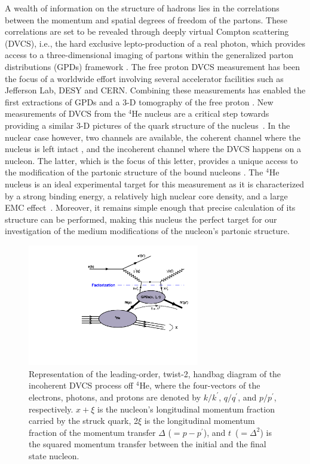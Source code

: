 \documentclass[twocolumn,nofootinbib,showpacs,prl,superscriptaddress,secnumarabic,amssymb,nobibnotes,aps,floatfix]{revtex4}
\begin{document}
A wealth of information on the structure of hadrons lies in the correlations 
between the momentum and spatial degrees of freedom of the partons. These 
correlations are set to be revealed through deeply virtual Compton scattering 
(DVCS), i.e., the hard exclusive lepto-production of a real photon, which 
provides access to a three-dimensional imaging of partons within the 
generalized parton distributions (GPDs) framework 
\cite{Mueller:1998fv,Ji:1996ek,Ji:1996nm,Radyushkin:1996nd,Radyushkin:1997ki}.   
The free proton DVCS measurement has been the focus of a worldwide effort 
\cite{Stepanyan:2001sm,Airapetian:2001yk,Airapetian:2006zr,Chekanov:2003ya,Aktas:2005ty,Chen:2006na,Munoz 
Camacho:2006hx,Girod:2007aa,Mazouz:2007aa,Gavalian:2009,Seder:2015,Pisano:2015,Jo:2015ema}
involving several accelerator facilities such as Jefferson Lab, DESY and  
CERN. Combining these measurements has enabled the first extractions of GPDs 
and a 3-D tomography of the free proton \cite{Guidal:2013rya,Dupre:2016mai}.  
New measurements of DVCS from the $^{4}$He nucleus are a critical 
step towards providing a similar 3-D pictures of the quark structure of the 
nucleus~\cite{Dupre:2015jha}. In the nuclear case however, two channels are available,
the coherent channel where the nucleus is left intact \cite{Airapetian:2009cga,
Hattawy:2017woc}, and the incoherent channel where the DVCS happens on a nucleon.
The latter, which is the focus of this letter, provides a unique access to the 
modification of the partonic structure of the bound nucleons 
\cite{simonetta_2,Guzey:2006xi,Guzey:2008fe}. The 
$^{4}$He nucleus is an ideal experimental target for this measurement as it is 
characterized by a strong binding energy, a relatively high nuclear 
core density, and a large EMC effect~\cite{JSeely}. Moreover, it remains simple 
enough that precise calculation of its structure 
can be performed, making this nucleus the perfect target for our investigation of the 
medium modifications of the nucleon's partonic structure. 


\begin{figure}[tb]
\includegraphics[width=7.5cm]{figs/handbag_incoherent.pdf}
\caption{Representation of the leading-order, twist-2, handbag diagram of the 
   incoherent DVCS process off $^4$He, where the four-vectors of the electrons, 
   photons, and protons are denoted by $k/k^\prime$, $q/q^\prime$, and 
   $p/p^\prime$, respectively. $x+\xi$ is the nucleon’s longitudinal momentum 
   fraction carried by the struck quark, 2$\xi$ is the longitudinal momentum 
   fraction of the momentum transfer $\Delta$ ($= p - p^\prime$), and 
   $t$~($=\Delta^2$) is the squared momentum transfer between the initial and
   the final state nucleon.}
\label{fig:diags}
\end{figure}
\end{document}
